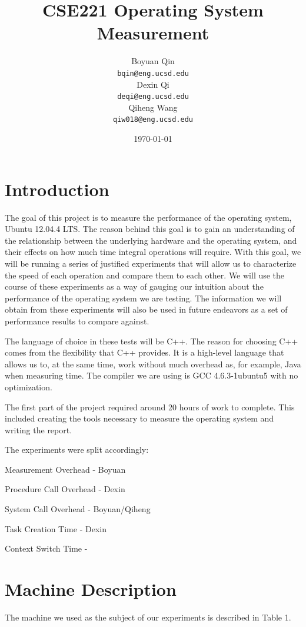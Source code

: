 \documentclass{article} %
\title{CSE221 Operating System Measurement}
\author{
  Boyuan Qin\\
  \texttt{bqin@eng.ucsd.edu}\\
  \And
  Dexin Qi\\
  \texttt{deqi@eng.ucsd.edu}\\
  \And
  Qiheng Wang\\
  \texttt{qiw018@eng.ucsd.edu}\\
}
\date{\today}
\begin{document}
\maketitle

\section{Introduction}
The goal of this project is to measure the performance of the operating
system, Ubuntu 12.04.4 LTS\@.  The reason behind this goal is to gain an
understanding of the relationship between the underlying hardware and the
operating system, and their effects on how much time integral operations will
require.  With this goal, we will be running a series of justified experiments
that will allow us to characterize the speed of each operation and compare
them to each other.  We will use the course of these experiments as a way of
gauging our intuition about the performance of the operating system we are
testing.  The information we will obtain from these experiments will also be
used in future endeavors as a set of performance results to compare against.

The language of choice in these tests will be C++.  The reason for choosing
C++ comes from the flexibility that C++ provides.  It is a high-level language
that allows us to, at the same time, work without much overhead as, for
example, Java when measuring time.  The compiler we are using is GCC
4.6.3-1ubuntu5 with no optimization.

The first part of the project required around 20 hours of work to complete. This included creating the tools necessary to measure the operating system and writing the report.

The experiments were split accordingly:

Measurement Overhead - Boyuan

Procedure Call Overhead - Dexin

System Call Overhead - Boyuan/Qiheng

Task Creation Time - Dexin

Context Switch Time -

\section{Machine Description}

The machine we used as the subject of our experiments is described in Table 1.
\end{document}
